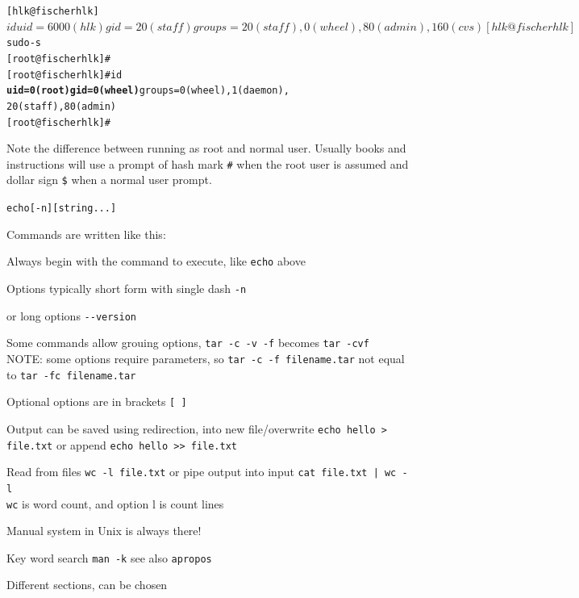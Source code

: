 \documentclass[Screen16to9,17pt]{foils}
\begin{document}


\begin{alltt}
\small
[hlk@fischer hlk]$ id
uid=6000(hlk) gid=20(staff) groups=20(staff),
0(wheel), 80(admin), 160(cvs)
[hlk@fischer hlk]$ sudo -s
[root@fischer hlk]#
[root@fischer hlk]# id {\bf
uid=0(root) gid=0(wheel)} groups=0(wheel), 1(daemon),
20(staff), 80(admin)
[root@fischer hlk]#
\end{alltt}

Note the difference between running as root and normal user. Usually books and instructions will use a prompt of hash mark \verb+#+ when the root user is assumed and dollar sign \verb+$+ when a normal user prompt.



\begin{alltt}
echo [-n] [string ...]
\end{alltt}

\begin{list1}
\item Commands are written like this:
\begin{list2}
\item Always begin with the command to execute, like \verb+echo+ above
\item Options typically short form with single dash \verb+-n+
\item or long options \verb+--version+
\item Some commands allow grouing options, \verb+tar -c -v -f+ becomes \verb+tar -cvf+\\
NOTE: some options require parameters, so \verb+tar -c -f filename.tar+ not equal to \verb+tar -fc filename.tar+
\item Optional options are in brackets \verb+[ ]+
\item Output can be saved using redirection, into new file/overwrite \verb+echo hello > file.txt+ or append \verb+echo hello >> file.txt+
\item Read from files \verb+wc -l file.txt+ or pipe output into input \verb+cat file.txt | wc -l+\\
\verb+wc+ is word count, and option l is count lines
\end{list2}
\end{list1}





\begin{list1}
\item Manual system in Unix is always there!
\item Key word search \verb+man -k+ see also \verb+apropos+
\item Different sections, can be chosen
\end{list1}
\end{document}
